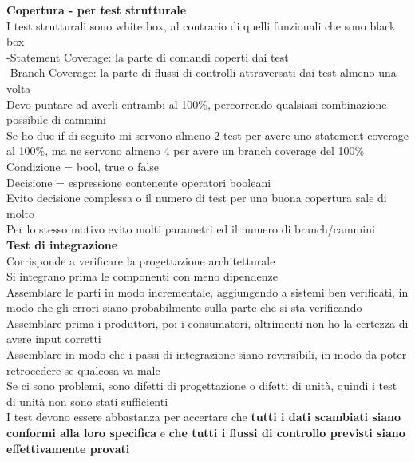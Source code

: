 \documentclass{article}
\begin{document}
				\textbf{Copertura - per test strutturale}\\
				I test strutturali sono white box, al contrario di quelli funzionali che sono black box\\
				-Statement Coverage: la parte di comandi coperti dai test\\
				-Branch Coverage: la parte di flussi di controlli attraversati dai test almeno una volta\\
				Devo puntare ad averli entrambi al 100\%, percorrendo qualsiasi combinazione possibile di cammini\\
				
				Se ho due if di seguito mi servono almeno 2 test per avere uno statement coverage al 100\%, ma ne servono almeno 4 per avere un branch coverage del 100\%\\
				
				Condizione = bool, true o false\\
				Decisione = espressione contenente operatori booleani\\
				Evito decisione complessa o il numero di test per una buona copertura sale di molto\\
				Per lo stesso motivo evito molti parametri ed il numero di branch/cammini\\
				
				\textbf{Test di integrazione}\\
				Corrisponde a verificare la progettazione architetturale\\
				Si integrano prima le componenti con meno dipendenze\\
				Assemblare le parti in modo incrementale, aggiungendo a sistemi ben verificati, in modo che gli errori siano probabilmente sulla parte che si sta verificando\\
				Assemblare prima i produttori, poi i consumatori, altrimenti non ho la certezza di avere input corretti\\
				Assemblare in modo che i passi di integrazione siano reversibili, in modo da poter retrocedere se qualcosa va male\\
				Se ci sono problemi, sono difetti di progettazione o difetti di unità, quindi i test di unità non sono stati sufficienti\\
				I test devono essere abbastanza per accertare che \textbf{tutti i dati scambiati siano conformi alla loro specifica} e \textbf{che tutti i flussi di controllo previsti siano effettivamente provati}\\
				
\end{document}
